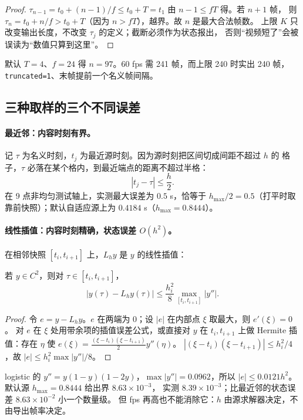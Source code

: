 \begin{proof}
$\tau_{n-1}=t_0+(n-1)/f\le t_0+T=t_1$ 由 $n-1\le fT$ 得。若 $n+1$ 帧，
则 $\tau_n=t_0+n/f>t_0+T$（因为 $n>fT$），越界。故 $n$ 是最大合法帧数。
上限 $K$ 只改变输出长度，不改变 $\tau_j$ 的定义；截断必须作为状态报出，
否则“视频短了”会被误读为“数值只算到这里”。
\end{proof}

默认 $T=4$、$f=24$ 得 $n=97$。60 fps 需 241 帧，而上限 240 时实出 240 帧，
\texttt{truncated=1}、末帧提前一个名义帧间隔。

\subsection{三种取样的三个不同误差}

\paragraph{最近邻：内容时刻有界。}
记 $\tau$ 为名义时刻，$t_j$ 为最近源时刻。因为源时刻把区间切成间距不超过 $h$ 的
格子，$\tau$ 必落在某个格内，到最近端点的距离不超过半格：
\begin{equation}
  |t_j-\tau|\le \frac{h}{2}.
\end{equation}
在 9 点非均匀测试轴上，实测最大误差为 $0.5$ s，恰等于 $h_{\max}/2=0.5$（打平时取
靠前快照）；默认自适应源上为 $0.4184$ s（$h_{\max}=0.8444$）。

\paragraph{线性插值：内容时刻精确，状态误差 $O(h^2)$。}
在相邻快照 $[t_i,t_{i+1}]$ 上，$L_h y$ 是 $y$ 的线性插值：
\begin{theorem}[线性插值误差]\label{thm:linear}
若 $y\in C^2$，则对 $\tau\in[t_i,t_{i+1}]$，
\[
  |y(\tau)-L_h y(\tau)|\le \frac{h_i^2}{8}\max_{[t_i,t_{i+1}]}|y''|.
\]
\end{theorem}

\begin{proof}
令 $e=y-L_h y$。$e$ 在两端为 0；设 $|e|$ 在内部点 $\xi$ 取最大，则 $e'(\xi)=0$。
对 $e$ 在 $\xi$ 处用带余项的插值误差公式，或直接对 $y$ 在 $t_i,t_{i+1}$ 上做
Hermite 插值：存在 $\eta$ 使
$e(\xi)=\frac{( \xi-t_i)(\xi-t_{i+1})}{2}y''(\eta)$。
$|(\xi-t_i)(\xi-t_{i+1})|\le h_i^2/4$，故 $|e|\le h_i^2\max|y''|/8$。
\end{proof}

logistic 的 $y''=y(1-y)(1-2y)$，$\max|y''|=0.0962$，所以
$|e|\le0.0121h^2$。默认源 $h_{\max}=0.8444$ 给出界 $8.63\times10^{-3}$，
实测 $8.39\times10^{-3}$；比最近邻的状态误差 $8.63\times10^{-2}$ 小一个数量级。
但 fps 再高也不能消除它：$h$ 由源求解器决定，不由导出帧率决定。

